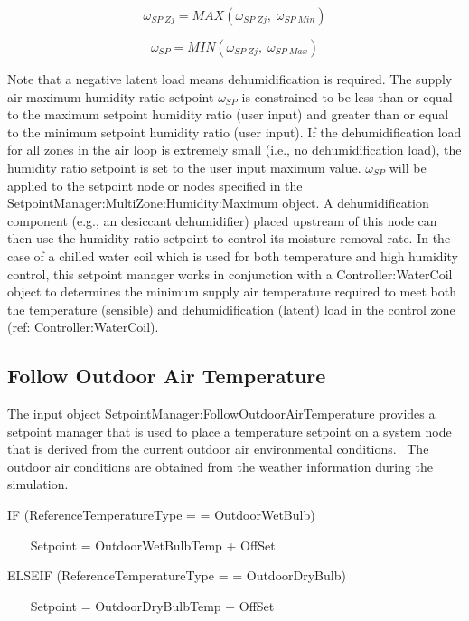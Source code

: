 \begin{equation}
{\omega_{SP\;Zj}} = MAX\left( {{\omega_{SP\;Zj}},\;{\omega_{SP\;Min}}} \right)
\end{equation}

\begin{equation}
{\omega_{SP}} = MIN\left( {{\omega_{SP\;Zj}},\;{\omega_{SP\;Max}}} \right)
\end{equation}

Note that a negative latent load means dehumidification is required. The supply air maximum humidity ratio setpoint \({\omega_{SP}}\) is constrained to be less than or equal to the maximum setpoint humidity ratio (user input) and greater than or equal to the minimum setpoint humidity ratio (user input). If the dehumidification load for all zones in the air loop is extremely small (i.e., no dehumidification load), the humidity ratio setpoint is set to the user input maximum value. \({\omega_{SP}}\) will be applied to the setpoint node or nodes specified in the SetpointManager:MultiZone:Humidity:Maximum object. A dehumidification component (e.g., an desiccant dehumidifier) placed upstream of this node can then use the humidity ratio setpoint to control its moisture removal rate. In the case of a chilled water coil which is used for both temperature and high humidity control, this setpoint manager works in conjunction with a Controller:WaterCoil object to determines the minimum supply air temperature required to meet both the temperature (sensible) and dehumidification (latent) load in the control zone (ref: Controller:WaterCoil).

\subsection{Follow Outdoor Air Temperature}\label{follow-outdoor-air-temperature}

The input object SetpointManager:FollowOutdoorAirTemperature provides a setpoint manager that is used to place a temperature setpoint on a system node that is derived from the current outdoor air environmental conditions.~ The outdoor air conditions are obtained from the weather information during the simulation.

IF (ReferenceTemperatureType = = OutdoorWetBulb)

~~~ Setpoint = OutdoorWetBulbTemp + OffSet

ELSEIF (ReferenceTemperatureType = = OutdoorDryBulb)

~~~ Setpoint = OutdoorDryBulbTemp + OffSet


